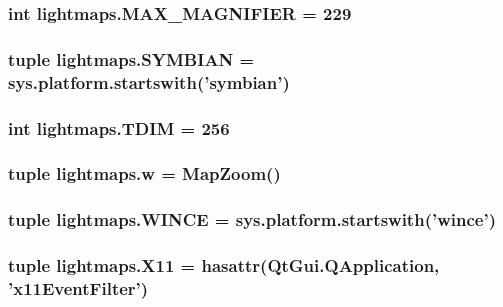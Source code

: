 \subsubsection[{M\+A\+X\+\_\+\+M\+A\+G\+N\+I\+F\+I\+E\+R}]{\setlength{\rightskip}{0pt plus 5cm}int lightmaps.\+M\+A\+X\+\_\+\+M\+A\+G\+N\+I\+F\+I\+E\+R = 229}\label{namespacelightmaps_aaf861bfc9d5d28a82a1d84679b8983d8}
\hypertarget{namespacelightmaps_a3e2b98a3c2a8fec632ebdca0cde38353}{}
\subsubsection[{S\+Y\+M\+B\+I\+A\+N}]{\setlength{\rightskip}{0pt plus 5cm}tuple lightmaps.\+S\+Y\+M\+B\+I\+A\+N = sys.\+platform.\+startswith('symbian')}\label{namespacelightmaps_a3e2b98a3c2a8fec632ebdca0cde38353}
\hypertarget{namespacelightmaps_af513aad5a9af9ba22e24c02a594ea537}{}
\subsubsection[{T\+D\+I\+M}]{\setlength{\rightskip}{0pt plus 5cm}int lightmaps.\+T\+D\+I\+M = 256}\label{namespacelightmaps_af513aad5a9af9ba22e24c02a594ea537}
\hypertarget{namespacelightmaps_afe12311368d70a63593808389d777b55}{}
\subsubsection[{w}]{\setlength{\rightskip}{0pt plus 5cm}tuple lightmaps.\+w = {\bf Map\+Zoom}()}\label{namespacelightmaps_afe12311368d70a63593808389d777b55}
\hypertarget{namespacelightmaps_a6142f09f81f6ad54f63b628940ba7747}{}
\subsubsection[{W\+I\+N\+C\+E}]{\setlength{\rightskip}{0pt plus 5cm}tuple lightmaps.\+W\+I\+N\+C\+E = sys.\+platform.\+startswith('wince')}\label{namespacelightmaps_a6142f09f81f6ad54f63b628940ba7747}
\hypertarget{namespacelightmaps_ae1bef5b3ad53ee3df29c4e5599c33288}{}
\subsubsection[{X11}]{\setlength{\rightskip}{0pt plus 5cm}tuple lightmaps.\+X11 = hasattr(Qt\+Gui.\+Q\+Application, 'x11\+Event\+Filter')}\label{namespacelightmaps_ae1bef5b3ad53ee3df29c4e5599c33288}
